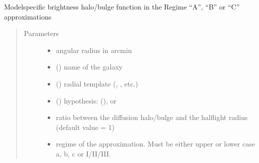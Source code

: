 \documentclass[letterpaper,10pt,english]{sphinxmanual}
\begin{document}
\begin{fulllineitems}
\label{\detokenize{diffsph.profiles:diffsph.profiles.massmodels.Hbr}}
\sphinxAtStartPar
Model\sphinxhyphen{}specific brightness halo/bulge function in the Regime “A”, “B” or “C” approximations
\begin{quote}\begin{description}
\item[{Parameters}] \leavevmode\begin{itemize}
\item {} 
\sphinxAtStartPar
{} \textendash{} angular radius in arcmin

\item {} 
\sphinxAtStartPar
{} () \textendash{} name of the galaxy

\item {} 
\sphinxAtStartPar
{} () \textendash{} radial template (, , etc.)

\item {} 
\sphinxAtStartPar
{} () \textendash{} hypothesis:  (),  or 

\item {} 
\sphinxAtStartPar
{} \textendash{} ratio between the diffusion halo/bulge and the half\sphinxhyphen{}light radius (default value = 1)

\item {} 
\sphinxAtStartPar
{} \textendash{} regime of the approximation. Must be either upper or lower case a, b, c or I/II/III.


\end{itemize}
\end{description}
\end{quote}
\end{fulllineitems}
\end{document}
